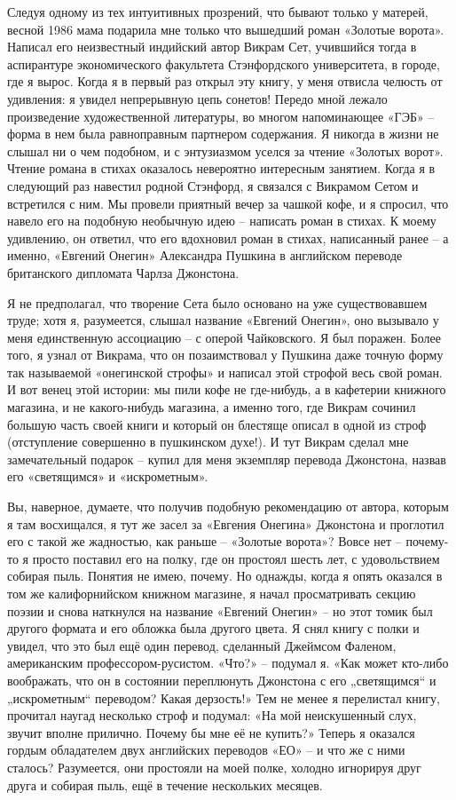 \documentclass[../main.tex]{subfiles}
\begin{document}
Следуя одному из тех интуитивных прозрений, что бывают только у матерей, весной 1986 мама подарила мне только что вышедший роман «Золотые ворота».
Написал его неизвестный индийский автор Викрам Сет, учившийся тогда в аспирантуре экономического факультета Стэнфордского университета, в городе, где я вырос.
Когда я в первый раз открыл эту книгу, у меня отвисла челюсть от удивления: я увидел непрерывную цепь сонетов!
Передо мной лежало произведение художественной литературы, во многом напоминающее «ГЭБ» \--- форма в нем была равноправным партнером содержания.
Я никогда в жизни не слышал ни о чем подобном, и с энтузиазмом уселся за чтение «Золотых ворот».
Чтение романа в стихах оказалось невероятно интересным занятием.
Когда я в следующий раз навестил родной Стэнфорд, я связался с Викрамом Сетом и встретился с ним.
Мы провели приятный вечер за чашкой кофе, и я спросил, что навело его на подобную необычную идею \--- написать роман в стихах.
К моему удивлению, он ответил, что его вдохновил роман в стихах, написанный ранее \--- а именно, «Евгений Онегин» Александра Пушкина в английском переводе британского дипломата Чарлза Джонстона.

Я не предполагал, что творение Сета было основано на уже существовавшем труде; хотя я, разумеется, слышал название «Евгений Онегин», оно вызывало у меня единственную ассоциацию \--- с оперой Чайковского.
Я был поражен.
Более того, я узнал от Викрама, что он позаимствовал у Пушкина даже точную форму так называемой «онегинской строфы» и написал этой строфой весь свой роман.
И вот венец этой истории: мы пили кофе не где-нибудь, а в кафетерии книжного магазина, и не какого-нибудь магазина, а именно того, где Викрам сочинил большую часть своей книги и который он блестяще описал в одной из строф (отступление совершенно в пушкинском духе!).
И тут Викрам сделал мне замечательный подарок \--- купил для меня экземпляр перевода Джонстона, назвав его «светящимся» и «искрометным».

Вы, наверное, думаете, что получив подобную рекомендацию от автора, которым я там восхищался, я тут же засел за «Евгения Онегина» Джонстона и проглотил его с такой же жадностью, как раньше \--- «Золотые ворота»?
Вовсе нет \--- почему-то я просто поставил его на полку, где он простоял шесть лет, с удовольствием собирая пыль.
Понятия не имею, почему.
Но однажды, когда я опять оказался в том же калифорнийском книжном магазине, я начал просматривать секцию поэзии и снова наткнулся на название «Евгений Онегин» \--- но этот томик был другого формата и его обложка была другого цвета.
Я снял книгу с полки и увидел, что это был ещё один перевод, сделанный Джеймсом Фаленом, американским профессором-русистом.
«Что?» \--- подумал я.
«Как может кто-либо воображать, что он в состоянии переплюнуть Джонстона с его „светящимся`` и „искрометным`` переводом? Какая дерзость!»
Тем не менее я перелистал книгу, прочитал наугад несколько строф и подумал: «На мой неискушенный слух, звучит вполне прилично. Почему бы мне её не купить?»
Теперь я оказался гордым обладателем двух английских переводов «ЕО» \--- и что же с ними сталось?
Разумеется, они простояли на моей полке, холодно игнорируя друг друга и собирая пыль, ещё в течение нескольких месяцев.
\end{document}
